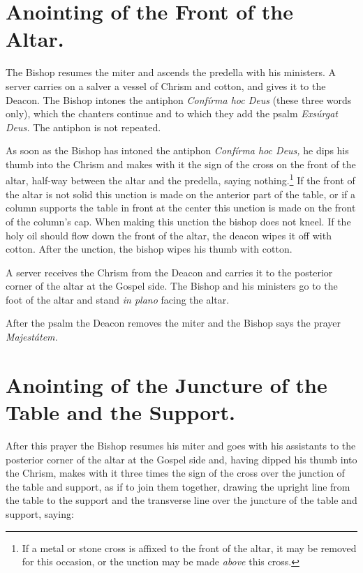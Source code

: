 \documentclass[letterpaper]{report}
\begin{document}
{    \section{Anointing of the Front of the Altar.}

    \rubric The Bishop resumes the miter and ascends the predella with his
    ministers. A server carries on a salver a vessel of Chrism and cotton, and
    gives it to the Deacon. The Bishop intones the antiphon \textit{Confírma
    hoc Deus} (these three words only), which the chanters continue and to
    which they add the psalm \textit{Exsúrgat Deus.} The antiphon is not
    repeated.

    \rubric As soon as the Bishop has intoned the antiphon \textit{Confírma hoc
    Deus,} he dips his thumb into the Chrism and makes with it the sign of the
    cross on the front of the altar, half-way between the altar and the
    predella, saying nothing.\footnote{If a metal or stone cross is affixed to
    the front of the altar, it may be removed for this occasion, or the unction
    may be made \textit{above} this cross.} If the front of the altar is not
    solid this unction is made on the anterior part of the table, or if a
    column supports the table in front at the center this unction is made on
    the front of the column's cap. When making this unction the bishop does not
    kneel. If the holy oil should flow down the front of the altar, the deacon
    wipes it off with cotton. After the unction, the bishop wipes his thumb
    with cotton.

    \rubric A server receives the Chrism from the Deacon and carries it to the
    posterior corner of the altar at the Gospel side. The Bishop and his
    ministers go to the foot of the altar and stand \textit{in plano} facing
    the altar.

    After the psalm the Deacon removes the miter and the Bishop says the prayer
    \textit{Majestátem.}

    \section{Anointing of the Juncture of the Table and the Support.}

    \rubric After this prayer the Bishop resumes his miter and goes with his
    assistants to the posterior corner of the altar at the Gospel side and,
    having dipped his thumb into the Chrism, makes with it three times the sign
    of the cross over the junction of the table and support, as if to join them
    together, drawing the upright line from the table to the support and the
    transverse line over the juncture of the table and support, saying:

}
\end{document}

